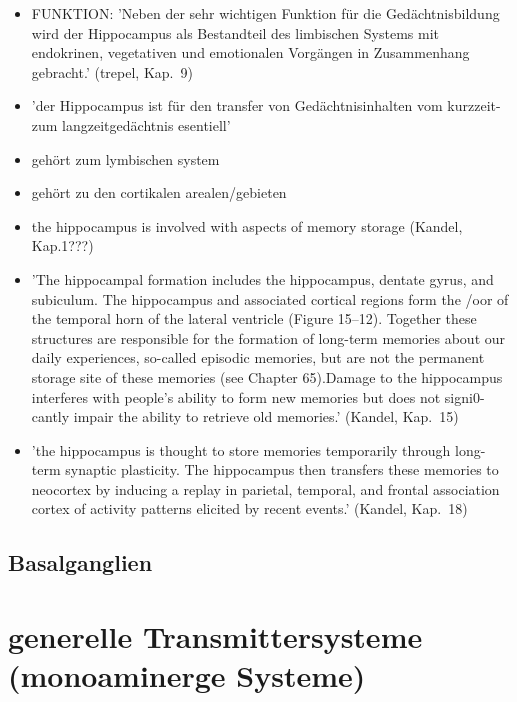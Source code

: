 \documentclass[12pt,a4paper,pdftex]{article}
\begin{document}
\begin{itemize}
\item FUNKTION: 'Neben der sehr wichtigen Funktion für die Gedächtnisbildung wird der Hippocampus als Bestandteil des limbischen Systems mit endokrinen, vegetativen und emotionalen Vorgängen in Zusammenhang gebracht.' (trepel, Kap.~9)

\item 'der Hippocampus ist für den transfer von Gedächtnisinhalten vom kurzzeit- zum langzeitgedächtnis esentiell' \cite[Kap.~6]{storch2012lehrbuchzoo}

\item gehört zum lymbischen system \cite[Kap.~6]{storch2012lehrbuchzoo}

\item gehört zu den cortikalen arealen/gebieten  \cite[Kap.~6]{storch2012lehrbuchzoo}

\item the hippocampus is involved with aspects of memory storage (Kandel, Kap.1???)

\item 'The hippocampal formation includes the hippocampus, dentate gyrus, and subiculum. The hippocampus and associated cortical regions form the /oor of the temporal horn of the lateral ventricle (Figure 15–12). Together these structures are responsible for the formation of long-term memories about our daily experiences, so-called episodic memories, but are not the permanent storage site of these memories (see Chapter 65).Damage to the hippocampus interferes with people’s ability to form new memories but does not signi0-cantly impair the ability to retrieve old memories.' (Kandel, Kap.~15)

\item 'the hippocampus is thought to store memories temporarily through long-term synaptic plasticity. The hippocampus then transfers these memories to neocortex by inducing a replay in parietal, temporal, and frontal association cortex of activity patterns elicited by recent events.' (Kandel, Kap.~18)

\end{itemize}

\subsection{Basalganglien}

\newpage
\section{generelle Transmittersysteme (monoaminerge Systeme)}
\end{document}
